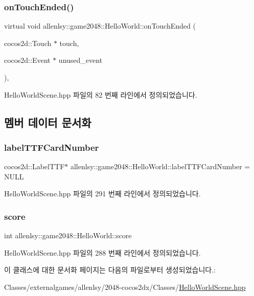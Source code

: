 \subsubsection{\texorpdfstring{on\+Touch\+Ended()}{onTouchEnded()}}
{\footnotesize\ttfamily virtual void allenlsy\+::game2048\+::\+Hello\+World\+::on\+Touch\+Ended (\begin{DoxyParamCaption}\item[{cocos2d\+::\+Touch $\ast$}]{touch,  }\item[{cocos2d\+::\+Event $\ast$}]{unused\+\_\+event }\end{DoxyParamCaption})\hspace{0.3cm}{\ttfamily [inline]}, {\ttfamily [virtual]}}



Hello\+World\+Scene.\+hpp 파일의 82 번째 라인에서 정의되었습니다.



\subsection{멤버 데이터 문서화}
\mbox{\label{classallenlsy_1_1game2048_1_1_hello_world_a08dbd0e2c7f6c6ac01f47e157d3b3911}} 
\subsubsection{\texorpdfstring{label\+T\+T\+F\+Card\+Number}{labelTTFCardNumber}}
{\footnotesize\ttfamily cocos2d\+::\+Label\+T\+TF$\ast$ allenlsy\+::game2048\+::\+Hello\+World\+::label\+T\+T\+F\+Card\+Number = N\+U\+LL}



Hello\+World\+Scene.\+hpp 파일의 291 번째 라인에서 정의되었습니다.

\mbox{\label{classallenlsy_1_1game2048_1_1_hello_world_af5e35e78792c3fe4a2d4ab6266e9c6e1}} 
\subsubsection{\texorpdfstring{score}{score}}
{\footnotesize\ttfamily int allenlsy\+::game2048\+::\+Hello\+World\+::score}



Hello\+World\+Scene.\+hpp 파일의 288 번째 라인에서 정의되었습니다.



이 클래스에 대한 문서화 페이지는 다음의 파일로부터 생성되었습니다.\+:\begin{DoxyCompactItemize}
\item 
Classes/externalgames/allenlsy/2048-\/cocos2dx/\+Classes/\hyperlink{_hello_world_scene_8hpp}{Hello\+World\+Scene.\+hpp}\end{DoxyCompactItemize}
